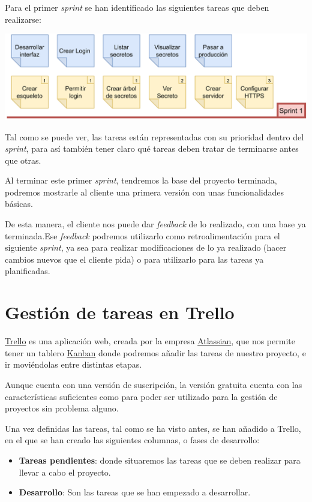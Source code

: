 \documentclass{\ClassPath/viu-tfm-template}
\begin{document}
Para el primer \textit{sprint} se han identificado las siguientes tareas que deben realizarse:

\begin{center}
    \includegraphics[width=\linewidth]{img/sprint1.png}
\end{center}

Tal como se puede ver, las tareas están representadas con su prioridad dentro del \textit{sprint}, para así también tener claro qué tareas deben tratar de terminarse antes que otras.

Al terminar este primer \textit{sprint}, tendremos la base del proyecto terminada, podremos mostrarle al cliente una primera versión con unas funcionalidades básicas.

De esta manera, el cliente nos puede dar \textit{feedback} de lo realizado, con una base ya terminada.Ese \textit{feedback} podremos utilizarlo como retroalimentación para el siguiente \textit{sprint}, ya sea para realizar modificaciones de lo ya realizado (hacer cambios nuevos que el cliente pida) o para utilizarlo para las tareas ya planificadas.


\chapter{Gestión de tareas en Trello}

\href{https://trello.com/}{Trello} es una aplicación web, creada por la empresa \href{https://www.atlassian.com/}{Atlassian}, que nos permite tener un tablero \href{https://en.wikipedia.org/wiki/Kanban_(development)}{Kanban} donde podremos añadir las tareas de nuestro proyecto, e ir moviéndolas entre distintas etapas.

Aunque cuenta con una versión de suscripción, la versión gratuita cuenta con las características suficientes como para poder ser utilizado para la gestión de proyectos sin problema alguno.

Una vez definidas las tareas, tal como se ha visto antes, se han añadido a Trello, en el que se han creado las siguientes columnas, o fases de desarrollo:

\begin{itemize}
    \item \textbf{Tareas pendientes}: donde situaremos las tareas que se deben realizar para llevar a cabo el proyecto.
    \item \textbf{Desarrollo}: Son las tareas que se han empezado a desarrollar.
\end{itemize}
\end{document}
